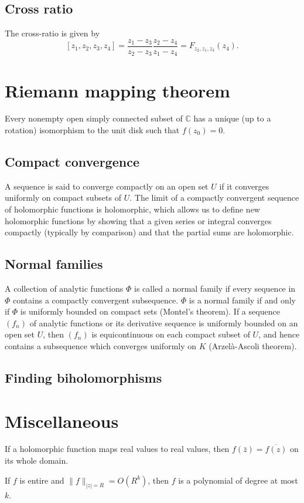 \documentclass{article}
\begin{document}
\subsection{Cross ratio}
The cross-ratio is given by
$$
  [z_1, z_2, z_3, z_4]
= \frac{z_1 - z_3}
       {z_2 - z_3}
  \frac{z_2 - z_4}
       {z_1 - z_4}
= F_{z_2, z_1, z_3}(z_4).
$$


\section{Riemann mapping theorem}
Every nonempty open simply connected subset of $\mathbb{C}$ has a
unique (up to a rotation) isomorphism to the unit disk such that
$f(z_0) = 0$.

\subsection{Compact convergence}
A sequence is said to converge compactly on an open set $U$ if it
converges uniformly on compact subsets of $U$. The limit of a
compactly convergent sequence of holomorphic functions is holomorphic,
which allows us to define new holomorphic functions by showing that a
given series or integral converges compactly (typically by comparison)
and that the partial sums are holomorphic.

\subsection{Normal families}
A collection of analytic functions $\Phi$ is called a normal family if every
sequence in $\Phi$ contains a compactly convergent subsequence.
$\Phi$ is a normal family if and only if $\Phi$ is uniformly bounded
on compact sets (Montel's theorem). If a sequence $(f_n)$ of analytic
functions or its derivative sequence is uniformly bounded on an open
set $U$, then $(f_n)$ is equicontinuous on each compact subset of $U$,
and hence contains a subsequence which converges uniformly on $K$
(Arzel\`a-Ascoli theorem).

\subsection{Finding biholomorphisms}

\section{Miscellaneous}
If a holomorphic function maps real values to real values, then
$f(\bar{z}) = \overline{f(z)}$ on its whole domain.

If $f$ is entire and $\| f \|_{|z| = R} = O(R^k)$, then $f$ is a
polynomial of degree at most $k$.
\end{document}
